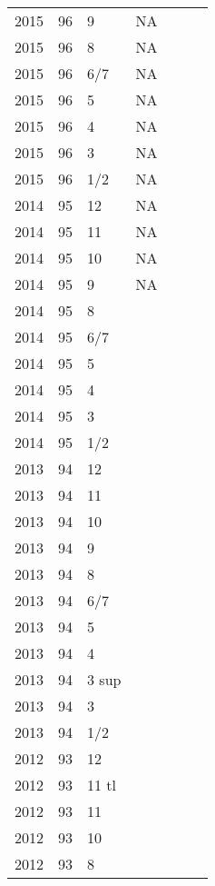 \begin{longtable}{ |l|l|l|l|p{2.7cm}|l|p{2cm}| }
 2015 & 96 &     9 &      NA &  &  & \\
 2015 & 96 &     8 &      NA &  &  & \\
 2015 & 96 &   6/7 &      NA  &  &  & \\
 2015 & 96 &     5 &      NA &  &  & \\
 2015 & 96 &     4 &      NA &  &  & \\
 2015 & 96 &     3 &      NA &  &  & \\
 2015 & 96 &   1/2 &      NA &  &  & \\
 2014 & 95 &    12 &      NA &  &  & \\
 2014 & 95 &    11 &      NA &  &  & \\
 2014 & 95 &    10 &      NA &  &  & \\
 2014 & 95 &     9 &      NA &  &  & \\
 2014 & 95 &     8 &         &  &  & \\
 2014 & 95 &   6/7 &         &  &  & \\
 2014 & 95 &     5 &         &  &  & \\
 2014 & 95 &     4 &         &  &  & \\
 2014 & 95 &     3 &         &  &  & \\
 2014 & 95 &   1/2 &         &  &  & \\
 2013 & 94 &    12 &         &  &   & \\
 2013 & 94 &    11 &         &  &  & \\
 2013 & 94 &    10 &         &  &  & \\
 2013 & 94 &     9 &         &  &  & \\
 2013 & 94 &     8 &         &  &  & \\
 2013 & 94 &   6/7 &         &  &  & \\
 2013 & 94 &     5 &         &  &  & \\
 2013 & 94 &     4 &         &  &  & \\
 2013 & 94 & 3 sup &         &  &  & \\
 2013 & 94 &     3 &         &  &  & \\
 2013 & 94 &   1/2 &         &  &  & \\
 2012 & 93 &    12 &         &  &  & \\
 2012 & 93 & 11 tl &         &  &  & \\
 2012 & 93 & 11    &         &  &  & \\
 2012 & 93 & 10    &         &  &   & \\
 2012 & 93 & 8     &         &  &  & \\

\end{longtable}
